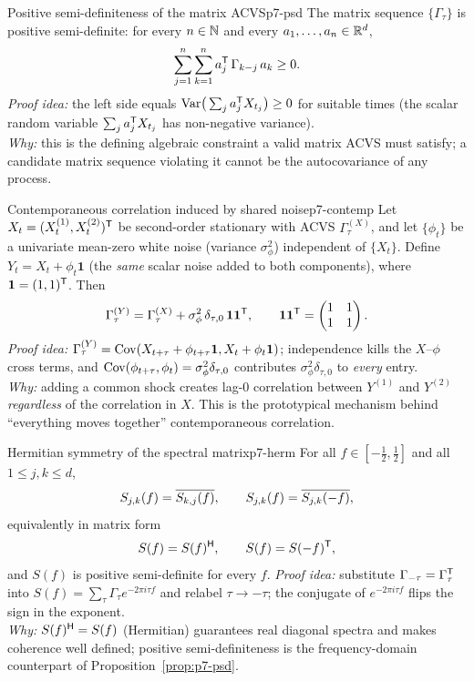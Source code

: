 \begin{proposition}{Positive semi-definiteness of the matrix ACVS}{p7-psd}
The matrix sequence $\{\Gamma_\tau\}$ is positive semi-definite: for every
$n\in\mathbb{N}$ and every $a_1,\dots,a_n\in\mathbb{R}^d$,
\[
\sum_{j=1}^n\sum_{k=1}^n a_j^{\mathsf{T}}\,\Gamma_{k-j}\,a_k\ge0 .
\]
\textit{Proof idea:} the left side equals $\operatorname{Var}\!\big(\sum_{j}a_j^{\mathsf{T}} X_{t_j}\big)\ge0$
for suitable times (the scalar random variable $\sum_j a_j^{\mathsf{T}} X_{t_j}$ has
non-negative variance).\\
\textit{Why:} this is the defining algebraic constraint a valid matrix ACVS must
satisfy; a candidate matrix sequence violating it cannot be the autocovariance
of any process.
\end{proposition}

\begin{proposition}{Contemporaneous correlation induced by shared noise}{p7-contemp}
Let $X_t=(X_t^{(1)},X_t^{(2)})^{\mathsf{T}}$ be second-order stationary with ACVS
$\Gamma_\tau^{(X)}$, and let $\{\phi_t\}$ be a univariate mean-zero white noise
(variance $\sigma_\phi^2$) independent of $\{X_t\}$. Define
$Y_t=X_t+\phi_t\mathbf{1}$ (the \emph{same} scalar noise added to both
components), where $\mathbf{1}=(1,1)^{\mathsf{T}}$. Then
\[
\Gamma_\tau^{(Y)}=\Gamma_\tau^{(X)}+\sigma_\phi^2\,\delta_{\tau,0}\,\mathbf 1\mathbf 1^{\mathsf{T}} ,
\qquad
\mathbf 1\mathbf 1^{\mathsf{T}}=\begin{pmatrix}1&1\\1&1\end{pmatrix}.
\]
\textit{Proof idea:} $\Gamma_\tau^{(Y)}=\operatorname{Cov}(X_{t+\tau}+\phi_{t+\tau}\mathbf1,
X_t+\phi_t\mathbf1)$; independence kills the $X$--$\phi$ cross terms, and
$\operatorname{Cov}(\phi_{t+\tau},\phi_t)=\sigma_\phi^2\delta_{\tau,0}$ contributes
$\sigma_\phi^2\delta_{\tau,0}$ to \emph{every} entry.\\
\textit{Why:} adding a common shock creates lag-$0$ correlation between
$Y^{(1)}$ and $Y^{(2)}$ \emph{regardless} of the correlation in $X$. This is the
prototypical mechanism behind ``everything moves together'' contemporaneous
correlation.
\end{proposition}

\begin{proposition}{Hermitian symmetry of the spectral matrix}{p7-herm}
For all $f\in[-\tfrac12,\tfrac12]$ and all $1\le j,k\le d$,
\[
S_{j,k}(f)=\overline{S_{k,j}(f)},\qquad
S_{j,k}(f)=\overline{S_{j,k}(-f)},
\]
equivalently in matrix form
\[
S(f)=S(f)^{\mathsf{H}},\qquad S(f)=S(-f)^{\mathsf{T}} ,
\]
and $S(f)$ is positive semi-definite for every $f$.
\textit{Proof idea:} substitute $\Gamma_{-\tau}=\Gamma_\tau^{\mathsf{T}}$ into
$S(f)=\sum_\tau\Gamma_\tau e^{-2\pi i\tau f}$ and relabel $\tau\to-\tau$; the
conjugate of $e^{-2\pi i\tau f}$ flips the sign in the exponent.\\
\textit{Why:} $S(f)^{\mathsf{H}}=S(f)$ (Hermitian) guarantees real diagonal spectra and
makes coherence well defined; positive semi-definiteness is the frequency-domain
counterpart of Proposition~\ref{prop:p7-psd}.
\end{proposition}

